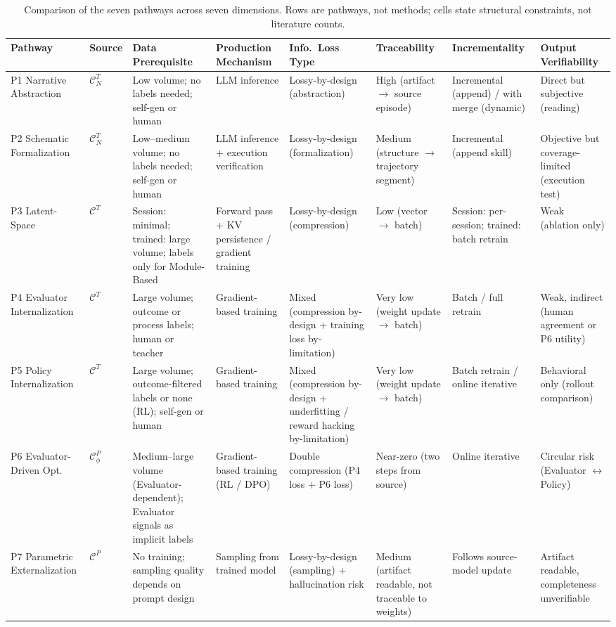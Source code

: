 \begin{table}[t]
\centering
\caption{Comparison of the seven pathways across seven dimensions. Rows are pathways, not methods; cells state structural constraints, not literature counts.}
\label{tab:pathway-comparison}
\scriptsize
\setlength{\tabcolsep}{2.5pt}
\renewcommand{\arraystretch}{1.15}
\begin{tabular}{@{}p{1.5cm}p{0.55cm}p{2.6cm}p{2.1cm}p{2.2cm}p{1.9cm}p{2.2cm}p{2.1cm}@{}}
\toprule
Pathway & Source & Data Prerequisite & Production Mechanism & Info.\ Loss Type & Traceability & Incrementality & Output Verifiability \\
\midrule
P1 Narrative Abstraction & $\mathcal{C}^T_N$ & Low volume; no labels needed; self-gen or human & LLM inference & Lossy-by-design (abstraction) & High (artifact $\rightarrow$ source episode) & Incremental (append) / with merge (dynamic) & Direct but subjective (reading) \\
\addlinespace
P2 Schematic Formalization & $\mathcal{C}^T_N$ & Low--medium volume; no labels needed; self-gen or human & LLM inference + execution verification & Lossy-by-design (formalization) & Medium (structure $\rightarrow$ trajectory segment) & Incremental (append skill) & Objective but coverage-limited (execution test) \\
\addlinespace
P3 Latent-Space & $\mathcal{C}^T$ & Session: minimal; trained: large volume; labels only for Module-Based & Forward pass + KV persistence / gradient training & Lossy-by-design (compression) & Low (vector $\rightarrow$ batch) & Session: per-session; trained: batch retrain & Weak (ablation only) \\
\addlinespace
P4 Evaluator Internalization & $\mathcal{C}^T$ & Large volume; outcome or process labels; human or teacher & Gradient-based training & Mixed (compression by-design + training loss by-limitation) & Very low (weight update $\rightarrow$ batch) & Batch / full retrain & Weak, indirect (human agreement or P6 utility) \\
\addlinespace
P5 Policy Internalization & $\mathcal{C}^T$ & Large volume; outcome-filtered labels or none (RL); self-gen or human & Gradient-based training & Mixed (compression by-design + underfitting / reward hacking by-limitation) & Very low (weight update $\rightarrow$ batch) & Batch retrain / online iterative & Behavioral only (rollout comparison) \\
\addlinespace
P6 Evaluator-Driven Opt. & $\mathcal{C}^P_\phi$ & Medium--large volume (Evaluator-dependent); Evaluator signals as implicit labels & Gradient-based training (RL / DPO) & Double compression (P4 loss + P6 loss) & Near-zero (two steps from source) & Online iterative & Circular risk (Evaluator $\leftrightarrow$ Policy) \\
\addlinespace
P7 Parametric Externalization & $\mathcal{C}^P$ & No training; sampling quality depends on prompt design & Sampling from trained model & Lossy-by-design (sampling) + hallucination risk & Medium (artifact readable, not traceable to weights) & Follows source-model update & Artifact readable, completeness unverifiable \\
\bottomrule
\end{tabular}
\end{table}

